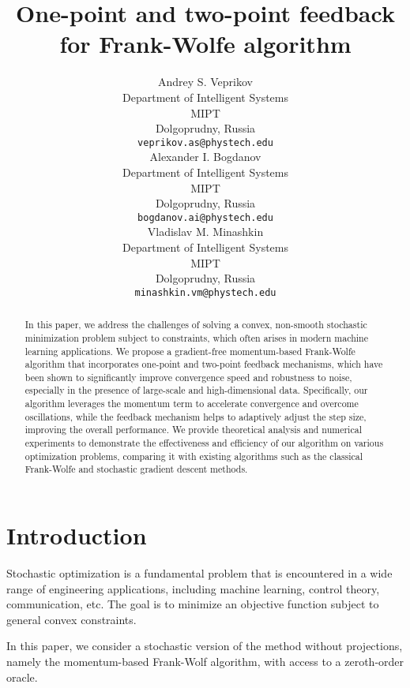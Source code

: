 \documentclass{article}
\title{One-point and two-point feedback for Frank-Wolfe algorithm}
\author{
    Andrey S. Veprikov\\
	Department of Intelligent Systems\\
	MIPT\\
	Dolgoprudny, Russia \\
	\texttt{veprikov.as@phystech.edu} \\
	\And
    Alexander I. Bogdanov\\
	Department of Intelligent Systems\\
	MIPT\\
	Dolgoprudny, Russia \\
	\texttt{bogdanov.ai@phystech.edu} \\
    \And
    Vladislav M. Minashkin\\
	Department of Intelligent Systems\\
	MIPT\\
	Dolgoprudny, Russia \\
	\texttt{minashkin.vm@phystech.edu} \\
}
\date{}
\begin{document}
\maketitle

\begin{abstract}


    In this paper, we address the challenges of solving a convex, non-smooth stochastic minimization problem subject to constraints, which often arises in modern machine learning applications. We propose a gradient-free momentum-based Frank-Wolfe algorithm that incorporates one-point and two-point feedback mechanisms, which have been shown to significantly improve convergence speed and robustness to noise, especially in the presence of large-scale and high-dimensional data. Specifically, our algorithm leverages the momentum term to accelerate convergence and overcome oscillations, while the feedback mechanism helps to adaptively adjust the step size, improving the overall performance. We provide theoretical analysis and numerical experiments to demonstrate the effectiveness and efficiency of our algorithm on various optimization problems, comparing it with existing algorithms such as the classical Frank-Wolfe and stochastic gradient descent methods.

\end{abstract}




\section{Introduction}

    Stochastic optimization is a fundamental problem that is encountered in a wide range of engineering applications, including machine learning, control theory, communication, etc. The goal is to minimize an objective function subject to general convex constraints.

    In this paper, we consider a stochastic version of the method without projections, namely the momentum-based Frank-Wolf algorithm, with access to a zeroth-order oracle.
\end{document}
